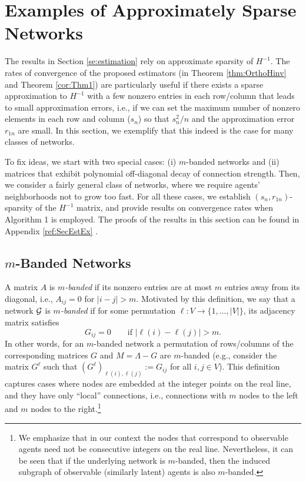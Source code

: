 \documentclass[opre,nonblindrev]{informs3} %
\begin{document}
\section{Examples of Approximately Sparse Networks} \label{se:estimationExamples}

{The results in Section
	\ref{se:estimation} 
	rely on approximate sparsity of $H^{-1}$.
	The rates of convergence of the proposed estimators (in Theorem \ref{thm:OrthoHinv} and Theorem \ref{cor:Thm1}) are particularly useful if there exists a sparse approximation to $H^{-1}$ with a few nonzero entries in each row/column that
	leads to small approximation errors, i.e.,
	if we can set  the maximum number of nonzero elements in each row and column ($s_n$) so that  $s_n^2/n$ and the approximation error $r_{1n}$ are small. In this section, we exemplify that this indeed is the case for many classes of networks.}

To fix ideas, we start with two special cases: (i) $m$-banded networks and (ii) matrices that exhibit polynomial off-diagonal decay of connection strength.
Then, we consider a fairly general class of networks,
where we require agents' neighborhoods  not to grow too fast.
For all these cases, we establish
$(s_n,r_{1n})$-sparsity of the $H^{-1}$ matrix, and provide results on convergence rates when Algorithm 1 is employed.
The proofs of the results in this section can be found in Appendix \ref{ref:SecEstEx}	.

\subsection{$m$-Banded Networks}
A matrix $A$ is \emph{$m$-banded} if its
nonzero entries are at most $m$ entries away from its diagonal, i.e.,
$A_{ij} = 0$ for $|i-j|>m$.
Motivated by this definition,
we say that a network $\cal G$ is \emph{$m$-banded} if
for some permutation $\ell:V\rightarrow \{1,\dots, |V| \}$,
its adjacency matrix satisfies
\begin{equation} \label{eq:mBanded}
G_{ij}=0 \qquad \mbox{if \ $|\ell(i)-\ell(j)|>m$}.
\end{equation}
In other words, for an $m$-banded network a permutation of  rows/columns of  the corresponding matrices $G$ and $M=\Lambda-G$ are $m$-banded (e.g., consider the matrix $G^\ell$ such that $(G^\ell)_{\ell(i),\ell(j)}:= G_{ij}$ for all $i,j\in V$).	
This definition captures cases where nodes
are embedded at the integer points on the real line, and they  have only
``local'' connections, i.e., connections with $m$ nodes to the left and $m$ nodes to the right.\footnote{We emphasize that in our context the
	nodes that correspond to observable agents need not be consecutive integers on the real line. Nevertheless, it can be seen that if the underlying  network is $m$-banded, then the induced subgraph of observable (similarly latent) agents is also $m$-banded.}
\end{document}
